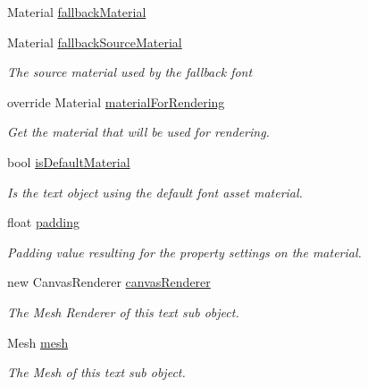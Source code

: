 \begin{DoxyCompactItemize}
Material \mbox{\hyperlink{class_t_m_pro_1_1_t_m_p___sub_mesh_u_i_a752da89e0deb52b9e005365ebc315fa1}{fallback\+Material}}
\item 
Material \mbox{\hyperlink{class_t_m_pro_1_1_t_m_p___sub_mesh_u_i_a9b771a5f56a567373c07d24fae47011c}{fallback\+Source\+Material}}
\begin{DoxyCompactList}\small\item\em The source material used by the fallback font \end{DoxyCompactList}\item 
override Material \mbox{\hyperlink{class_t_m_pro_1_1_t_m_p___sub_mesh_u_i_acf8eb0b73fe8fe9f4b12d71550739bb1}{material\+For\+Rendering}}
\begin{DoxyCompactList}\small\item\em Get the material that will be used for rendering. \end{DoxyCompactList}\item 
bool \mbox{\hyperlink{class_t_m_pro_1_1_t_m_p___sub_mesh_u_i_afeb2c2de9cff26385cf00802a8d356da}{is\+Default\+Material}}
\begin{DoxyCompactList}\small\item\em Is the text object using the default font asset material. \end{DoxyCompactList}\item 
float \mbox{\hyperlink{class_t_m_pro_1_1_t_m_p___sub_mesh_u_i_a739f793cbda2c66b096ddf5ce3b1658f}{padding}}
\begin{DoxyCompactList}\small\item\em Padding value resulting for the property settings on the material. \end{DoxyCompactList}\item 
new Canvas\+Renderer \mbox{\hyperlink{class_t_m_pro_1_1_t_m_p___sub_mesh_u_i_a4888f8c9e99911b05312c1ed5a578a33}{canvas\+Renderer}}
\begin{DoxyCompactList}\small\item\em The Mesh Renderer of this text sub object. \end{DoxyCompactList}\item 
Mesh \mbox{\hyperlink{class_t_m_pro_1_1_t_m_p___sub_mesh_u_i_a90820457f70262482c28723f1265876a}{mesh}}
\begin{DoxyCompactList}\small\item\em The Mesh of this text sub object. \end{DoxyCompactList}\end{DoxyCompactItemize}


